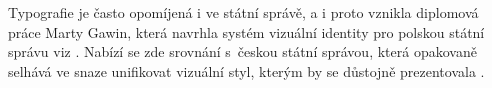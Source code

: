 \documentclass[11pt,a4paper]{article}
\begin{document}
Typografie je často opomíjená i ve státní správě, a i proto vznikla diplomová práce Marty Gawin, která navrhla systém vizuální identity pro polskou státní správu viz \citep{Gawin:2011}. Nabízí se zde srovnání s~českou státní správou, která opakovaně selhává ve snaze unifikovat vizuální styl, kterým by se důstojně prezentovala \citep{Pecina:2012}. 
\newpage
\renewcommand{\refname}{Literatura}


\end{document}
